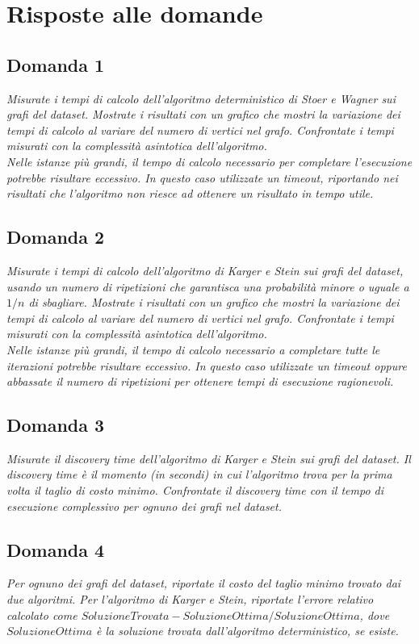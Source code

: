 \section{Risposte alle domande}

\subsection{Domanda 1}
\textit{Misurate i tempi di calcolo dell'algoritmo deterministico di Stoer e Wagner sui grafi del dataset. Mostrate i risultati con un grafico che mostri la variazione dei tempi di calcolo al variare del numero di vertici nel grafo. Confrontate i tempi misurati con la complessità asintotica dell'algoritmo. \\
Nelle istanze più grandi, il tempo di calcolo necessario per completare l'esecuzione potrebbe risultare eccessivo. In questo caso utilizzate un timeout, riportando nei risultati che l'algoritmo non riesce ad ottenere un risultato in tempo utile.}

\subsection{Domanda 2}
\textit{Misurate i tempi di calcolo dell'algoritmo di Karger e Stein sui grafi del dataset, usando un numero di ripetizioni che garantisca una probabilità minore o uguale a $1/n$ di sbagliare. Mostrate i risultati con un grafico che mostri la variazione dei tempi di calcolo al variare del numero di vertici nel grafo. Confrontate i tempi misurati con la complessità asintotica dell'algoritmo. \\
Nelle istanze più grandi, il tempo di calcolo necessario a completare tutte le iterazioni potrebbe risultare eccessivo. In questo caso utilizzate un timeout oppure abbassate il numero di ripetizioni per ottenere tempi di esecuzione ragionevoli.}


\subsection{Domanda 3}
\textit{Misurate il discovery time dell'algoritmo di Karger e Stein sui grafi del dataset. Il discovery time è il momento (in secondi) in cui l'algoritmo trova per la prima volta il taglio di costo minimo.  Confrontate il discovery time con il tempo di esecuzione complessivo per ognuno dei grafi nel dataset.}

\subsection{Domanda 4}
\textit{Per ognuno dei grafi del dataset, riportate il costo del taglio minimo trovato dai due algoritmi. Per l'algoritmo di Karger e Stein, riportate l'errore relativo calcolato come $SoluzioneTrovata-SoluzioneOttima/SoluzioneOttima$, dove $SoluzioneOttima$ è la soluzione trovata dall'algoritmo deterministico, se esiste.}

